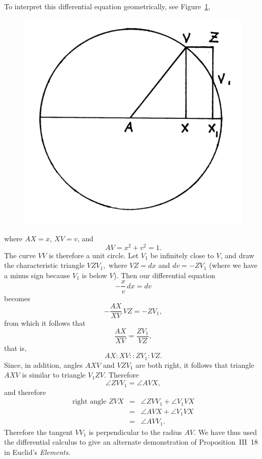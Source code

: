 \documentclass[twoside,openright]{article}
\begin{document}
\begin{enumerate}
To interpret this differential equation geometrically, see
Figure~\ref{circex},
\begin{figure}[htp]
\begin{center}
\includegraphics[width=.5\textwidth]{fig/Figure11A}
\caption{}
\label{circex}
\vspace{-10pt}
\end{center}
\end{figure}
where $AX = x$, $XV = v$, and 
$$AV = x^2 + v^2 =1.$$
The curve $VV$ is therefore a unit circle.  Let $V_1$ be infinitely
close to $V$, and draw the characteristic triangle $VZV_1,$ where
$VZ = dx$ and $dv = -ZV_1$ (where we have a minus sign because $V_1$
is below $V$).  Then our differential equation
$$-\frac{x}{v}\,dx = dv$$
becomes
$$-\frac{AX}{XV}\,VZ = - ZV_1,$$
from which it follows that
$$\frac{AX}{XV} = \frac{ZV_1}{VZ},$$
that is,
$$ AX \!:\! XV :: ZV_1 \!:\! VZ.$$
Since, in addition, angles $AXV$ and $VZV_1$ are both right, it
follows that triangle $AXV$ is similar to triangle $V_1ZV$.  Therefore
$$\angle ZVV_1 = \angle AVX,$$
and therefore
\begin{eqnarray*}
\mbox{right angle }ZVX & = & \angle ZVV_1 + \angle V_1VX\\
& = & \angle AVX + \angle V_1VX\\
& = & \angle AVV_1.
\end{eqnarray*}
Therefore the tangent $VV_1$ is perpendicular to the radius $AV$.  We
have thus used the differential calculus to give an alternate
demonstration of Proposition~III~18 in Euclid's {\em Elements}.



\end{enumerate}
\end{document}
